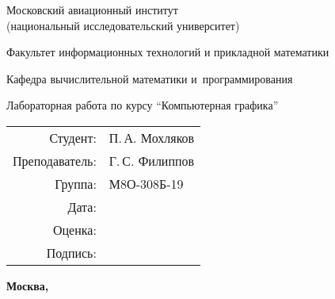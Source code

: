\begin{titlepage}
\begin{center}
\bfseries

{\Large Московский авиационный институт\\ (национальный исследовательский университет)}

\vspace{48pt}

{\large Факультет информационных технологий и прикладной математики}

\vspace{36pt}

{\large Кафедра вычислительной математики и~программирования}


\vspace{48pt}

Лабораторная работа  по курсу \enquote{Компьютерная графика}

\end{center}

\vspace{72pt}

\begin{flushright}
\begin{tabular}{rl}
Студент: & П.\,А. Мохляков \\
Преподаватель: & Г.\,С. Филиппов \\
Группа: & М8О-308Б-19 \\
Дата: & \\
Оценка: & \\
Подпись: & \\
\end{tabular}
\end{flushright}

\vfill

\begin{center}
\bfseries
Москва, \the\year
\end{center}
\end{titlepage}

\pagebreak
